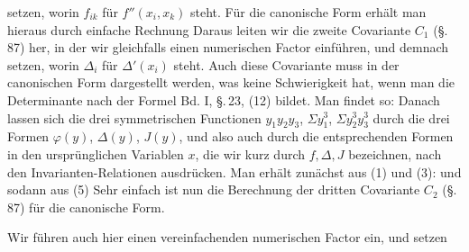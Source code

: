 setzen, worin $f_{ik}$ für $f''(x_i,x_k)$ steht. Für die canonische Form erhält man hieraus durch einfache Rechnung
Daraus leiten wir die zweite Covariante $C_1$ (\S.\,87) her, in der wir gleichfalls einen numerischen Factor einführen, und demnach
setzen, worin $\Delta_i$ für $\Delta'(x_i)$ steht. Auch diese Covariante muss in der canonischen Form dargestellt werden, was keine Schwierigkeit hat, wenn man die Determinante nach der Formel Bd. I, \S.\,23, (12) bildet. Man findet so:
Danach lassen sich die drei symmetrischen Functionen $y_1y_2y_3$, $\Sigma y_1^3$, $\Sigma y_2^3y_3^3$ durch die drei Formen $\varphi(y)$, $\Delta(y)$, $J(y)$, und also auch durch die entsprechenden Formen in den ursprünglichen Variablen $x$, die wir kurz durch $f,\Delta,J$ bezeichnen, nach den Invarianten-Relationen
ausdrücken. Man erhält zunächst aus (1) und (3):
und sodann aus (5)
Sehr einfach ist nun die Berechnung der dritten Covariante $C_2$ (\S.\,87) für die canonische Form.

Wir führen auch hier einen vereinfachenden numerischen Factor ein, und setzen
